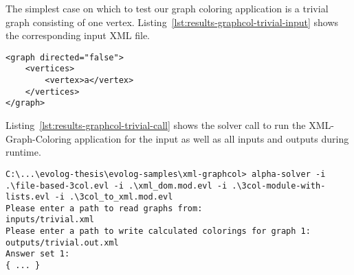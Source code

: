\begin{example}
\label{ex:results-graphcol-trivial}
The simplest case on which to test our graph coloring application is a trivial graph consisting of one vertex. Listing~\ref{lst:results-graphcol-trivial-input} shows the corresponding input XML file.

\begin{lstlisting}[style=asp-code, label={lst:results-graphcol-trivial-input}, caption={One-vertex graph in XML encoding.}]
<graph directed="false">
    <vertices>
        <vertex>a</vertex>
    </vertices>
</graph>    
\end{lstlisting}  

Listing~\ref{lst:results-graphcol-trivial-call} shows the solver call to run the XML-Graph-Coloring application for the input as well as all inputs and outputs during runtime.

\begin{lstlisting}[style=asp-code, label={lst:results-graphcol-trivial-call}, caption={Running the application for a one-vertex graph.}]
C:\...\evolog-thesis\evolog-samples\xml-graphcol> alpha-solver -i .\file-based-3col.evl -i .\xml_dom.mod.evl -i .\3col-module-with-lists.evl -i .\3col_to_xml.mod.evl 
Please enter a path to read graphs from:
inputs/trivial.xml
Please enter a path to write calculated colorings for graph 1:
outputs/trivial.out.xml
Answer set 1:
{ ... }
\end{lstlisting}


\end{example}
